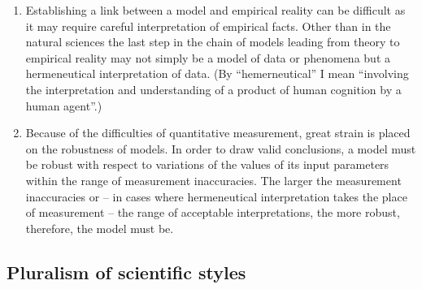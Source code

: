 \documentclass[onecollarge]{STJour}
\numberwithin{equation}{section}
\begin{document}
\begin{enumerate}
\item Establishing a link between a model and empirical reality can be
difficult as it may require careful interpretation of empirical facts. Other than
in the natural sciences the last step in the chain of models leading from
theory to empirical reality may not simply be a model of data or
phenomena but a hermeneutical interpretation of data. (By ``hemerneutical''
I mean ``involving the interpretation and understanding of a product
of human cognition by a human agent''.)


\item Because of the difficulties of quantitative measurement, great
strain is placed on the robustness of models. In order to draw valid
conclusions, a model must be robust with respect to variations of the
values of its input parameters within the range of measurement
inaccuracies. The larger the measurement inaccuracies or -- in cases
where hermeneutical interpretation takes the place of measurement -- the
range of acceptable interpretations, the more robust, therefore, the
model must be.

\end{enumerate}

\subsection{Pluralism of scientific styles} 
\end{document}
